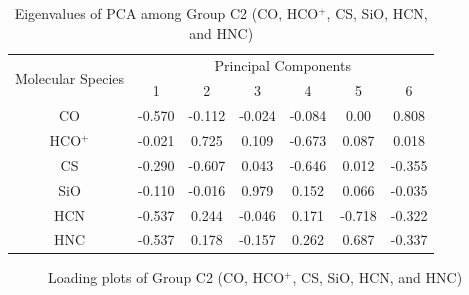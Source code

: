 \documentclass{aa}
\begin{document}
\begin{CJK*}{UTF8}{gbsn}
 

\begin{table}[htp]
\centering
\begin{tabular}{ccccccc}
\hline\hline
\multirow{2}{*}{Molecular Species} & \multicolumn{6}{c}{Principal Components}                 \\ \cline{2-7} 
                                   & 1       & 2       & 3       & 4       & 5      & 6       \\ \hline
CO                                 & -0.570 & -0.112 & -0.024 & -0.084 & 0.00 & 0.808  \\ \hline
HCO$^+$                               & -0.021 & 0.725  & 0.109  & -0.673 & 0.087  & 0.018  \\ \hline
CS                                 & -0.290 & -0.607 & 0.043  & -0.646 & 0.012 & -0.355 \\ \hline
SiO                                & -0.110 & -0.016 & 0.979  & 0.152  & 0.066  & -0.035 \\ \hline
HCN                                & -0.537 & 0.244  & -0.046 & 0.171  & -0.718 & -0.322 \\ \hline
HNC                                & -0.537 & 0.178  & -0.157 & 0.262  & 0.687 & -0.337 \\ \hline\hline
\end{tabular}
\caption{Eigenvalues of PCA among Group C2 (CO, HCO$^+$, CS, SiO, HCN, and HNC)}
\label{table-6-eigen}
\end{table}
   

      \begin{figure}[htbp]
\centering  
{}
\caption{Loading plots of Group C2 (CO, HCO$^+$, CS, SiO, HCN, and HNC)}
\label{Fig-6-load}
\end{figure}
   

\end{CJK*}
\end{document}
